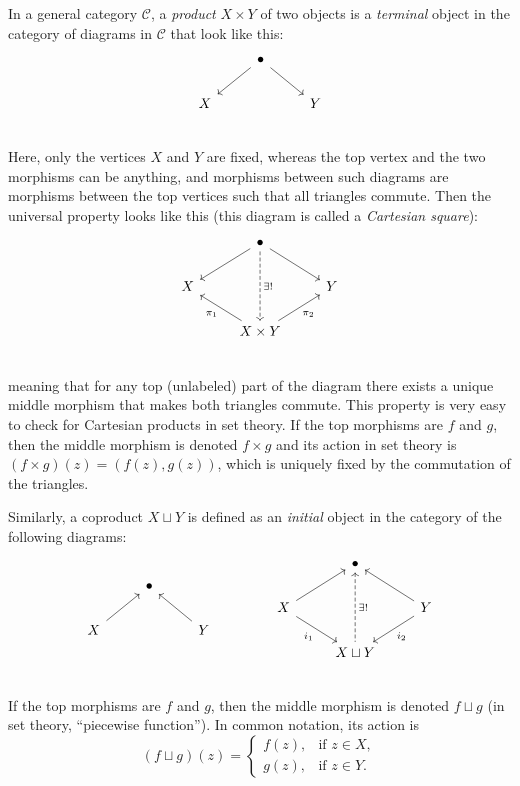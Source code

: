 \begin{defn}[Products]
    In a general category $\mathcal{C}$, a \emph{product} $X\times Y$ of two
    objects is a \emph{terminal} object in the category of diagrams
    in $\mathcal{C}$ that look like this:\[\begin{tikzcd}
        & \bullet \arrow[dl]\arrow[dr]& \\
    X& & Y\\
    \end{tikzcd}\]Here, only the vertices $X$ and $Y$ are fixed, whereas the top vertex
    and the two morphisms can be anything, and morphisms between such
    diagrams are morphisms between the top vertices such that all triangles
    commute. Then the universal property looks like this (this diagram
    is called a \emph{Cartesian square}):
    \[\begin{tikzcd}
        & \bullet \arrow[dl]\arrow[dr]\arrow[dd,dashed,"\exists!"]& \\
    X& & Y\\
    &X\times Y\arrow[ul,"\pi_1"]\arrow[ur,swap,"\pi_2"]& \\
    \end{tikzcd}\]
    meaning that for any top (unlabeled) part of the diagram there exists
    a unique middle morphism that makes both triangles commute. This property
    is very easy to check for Cartesian products in set theory. If the
    top morphisms are $f$ and $g$, then the middle morphism is denoted
    $f\times g$ and its action in set theory is $(f\times g)(z)=(f(z),g(z))$, which is uniquely fixed by the commutation of the triangles.
\end{defn}
%
\begin{defn}[Coproducts]
    Similarly, a coproduct $X\sqcup Y$ is defined as an \emph{initial}
    object in the category of the following diagrams:\[\begin{tikzcd}
        & \bullet \arrow[dl,leftarrow]\arrow[dr,leftarrow]& \\
    X& & Y\\
    \end{tikzcd}\quad\quad\quad\quad
    \begin{tikzcd}
        & \bullet \arrow[dl,leftarrow]\arrow[dr,leftarrow]\arrow[dd,leftarrow,dashed,"\exists!"]& \\
    X& & Y\\
    &X\sqcup Y\arrow[ul,leftarrow,"i_1"]\arrow[ur,leftarrow,swap,"i_2"]& \\
    \end{tikzcd}
    \]If the top morphisms are $f$ and $g$, then the middle morphism is
    denoted $f\sqcup g$ (in set theory, ``piecewise function''). In common notation, its action is 
    \[(f\sqcup g)(z)=\begin{cases}
        f(z), & \text{if }z\in X,\\
        g(z), & \text{if }z\in Y.
    \end{cases}\]
\end{defn}
